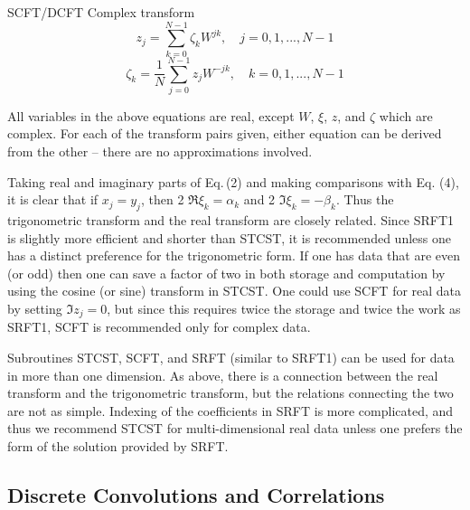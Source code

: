 \documentclass[twoside]{MATH77}
\begin{document}
SCFT/DCFT Complex transform
\begin{equation}\label{O9}
z_j=\sum_{k=0}^{N-1}\zeta _kW^{jk},\quad j=0,1,...,N-1
\end{equation}
\vspace{-10pt}
\begin{equation}\label{O10}
\zeta _k=\frac 1N \sum_{j=0}^{N-1}z_jW^{-jk},\quad k=0,1,...,N-1
\end{equation}

All variables in the above equations are real, except $W$, $\xi $,
$z$, and $ \zeta $ which are complex. For each of the transform pairs
given, either equation can be derived from the other -- there are no
approximations involved.

Taking real and imaginary parts of Eq.\,(2) and making comparisons with Eq.
(4), it is clear that if $x_j=y_j$, then 2 $\Re \xi _k=\alpha _k$ and
2 $\Im \xi _k=-\beta _k$. Thus the trigonometric transform and the real
transform are closely related. Since SRFT1 is slightly more efficient and
shorter than STCST, it is recommended unless one has a distinct preference
for the trigonometric form. If one has data that are even (or odd) then
one can save a factor of two in both storage and computation by using the
cosine (or sine) transform in STCST. One could use SCFT for real data by
setting $\Im z_j=0$, but since this requires twice the storage and twice
the work as SRFT1, SCFT is recommended only for complex data.

Subroutines STCST, SCFT, and SRFT (similar to SRFT1) can be used for
data in more than one dimension. As above, there is a connection
between the real transform and the trigonometric transform, but the
relations connecting the two are not as simple. Indexing of the
coefficients in SRFT is more complicated, and thus we recommend STCST
for multi-dimensional real data unless one prefers the form of the
solution provided by SRFT.

\subsection{Discrete Convolutions and Correlations}
\end{document}
